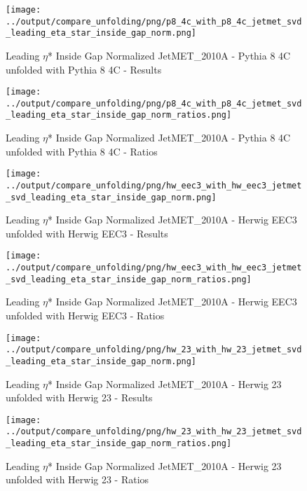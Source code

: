 \documentclass[11pt]{book}
\begin{document}
\begin{figure}[ht]
\centering
\texttt{[image: ../output/compare\_unfolding/png/p8\_4c\_with\_p8\_4c\_jetmet\_svd\_leading\_eta\_star\_inside\_gap\_norm.png]}
\caption{Leading $\eta$* Inside Gap Normalized JetMET\_2010A - Pythia 8 4C unfolded with Pythia 8 4C - Results}
\label{p8_p8_jetmet_svd_leading_eta_star_inside_gap_norm_a}
\end{figure}

\begin{figure}[ht]
\centering
\texttt{[image: ../output/compare\_unfolding/png/p8\_4c\_with\_p8\_4c\_jetmet\_svd\_leading\_eta\_star\_inside\_gap\_norm\_ratios.png]}
\caption{Leading $\eta$* Inside Gap Normalized JetMET\_2010A - Pythia 8 4C unfolded with Pythia 8 4C - Ratios}
\label{p8_p8_jetmet_svd_leading_eta_star_inside_gap_norm_b}
\end{figure}

\begin{figure}[ht]
\centering
\texttt{[image: ../output/compare\_unfolding/png/hw\_eec3\_with\_hw\_eec3\_jetmet\_svd\_leading\_eta\_star\_inside\_gap\_norm.png]}
\caption{Leading $\eta$* Inside Gap Normalized JetMET\_2010A - Herwig EEC3 unfolded with Herwig EEC3 - Results}
\label{hw_eec3_hw_eec3_jetmet_svd_leading_eta_star_inside_gap_norm_a}
\end{figure}

\begin{figure}[ht]
\centering
\texttt{[image: ../output/compare\_unfolding/png/hw\_eec3\_with\_hw\_eec3\_jetmet\_svd\_leading\_eta\_star\_inside\_gap\_norm\_ratios.png]}
\caption{Leading $\eta$* Inside Gap Normalized JetMET\_2010A - Herwig EEC3 unfolded with Herwig EEC3 - Ratios}
\label{hw_eec3_hw_eec3_jetmet_svd_leading_eta_star_inside_gap_norm_b}
\end{figure}

\begin{figure}[ht]
\centering
\texttt{[image: ../output/compare\_unfolding/png/hw\_23\_with\_hw\_23\_jetmet\_svd\_leading\_eta\_star\_inside\_gap\_norm.png]}
\caption{Leading $\eta$* Inside Gap Normalized JetMET\_2010A - Herwig 23 unfolded with Herwig 23 - Results}
\label{hw_23_hw_23_jetmet_svd_leading_eta_star_inside_gap_norm_a}
\end{figure}

\begin{figure}[ht]
\centering
\texttt{[image: ../output/compare\_unfolding/png/hw\_23\_with\_hw\_23\_jetmet\_svd\_leading\_eta\_star\_inside\_gap\_norm\_ratios.png]}
\caption{Leading $\eta$* Inside Gap Normalized JetMET\_2010A - Herwig 23 unfolded with Herwig 23 - Ratios}
\label{hw_23_hw_23_jetmet_svd_leading_eta_star_inside_gap_norm_b}
\end{figure}
\end{document}

